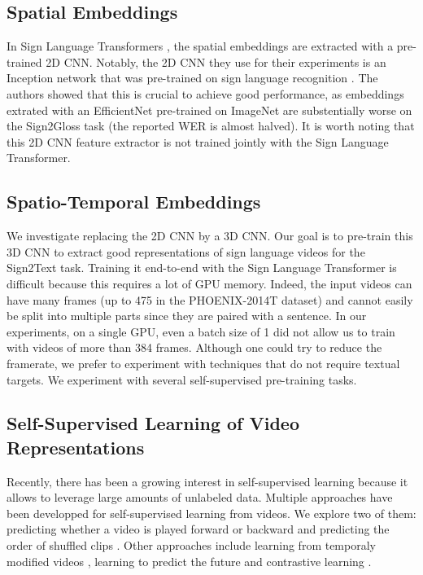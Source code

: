 \documentclass[final]{cvpr}
\begin{document}
\subsection{Spatial Embeddings}

In Sign Language Transformers \cite{neccam}, the spatial embeddings are extracted with a pre-trained 2D CNN. Notably, the 2D CNN they use for their experiments is an Inception network that was pre-trained on sign language recognition \cite{hmm}. The authors \cite{neccam} showed that this is crucial to achieve good performance, as embeddings extrated with an EfficientNet \cite{effnet} pre-trained on ImageNet are substentially worse on the Sign2Gloss task (the reported WER is almost halved).
It is worth noting that this 2D CNN feature extractor is not trained jointly with the Sign Language Transformer.
\subsection{Spatio-Temporal Embeddings}
We investigate replacing the 2D CNN by a 3D CNN. Our goal is to pre-train this 3D CNN to extract good representations of sign language videos for the Sign2Text task. Training it end-to-end with the Sign Language Transformer is difficult because this requires a lot of GPU memory. Indeed, the input videos can have many frames (up to 475 in the PHOENIX-2014T \cite{phoenix} dataset) and cannot easily be split into multiple parts since they are paired with a sentence. In our experiments, on a single GPU, even a batch size of 1 did not allow us to train with videos of more than 384 frames. Although one could try to reduce the framerate, we prefer to experiment with techniques that do not require textual targets. We experiment with several self-supervised pre-training tasks.
\subsection{Self-Supervised Learning of Video Representations}
Recently, there has been a growing interest in self-supervised learning because it allows to leverage large amounts of unlabeled data. Multiple approaches have been developped for self-supervised learning from videos. We explore two of them: predicting whether a video is played forward or backward \cite{arrow} and predicting the order of shuffled clips \cite{vcop}. Other approaches include learning from temporaly modified videos \cite{playback-rate, pace, temp-trans}, learning to predict the future \cite{pred-coding} and contrastive learning \cite{contrast, bert-video}.
\end{document}
